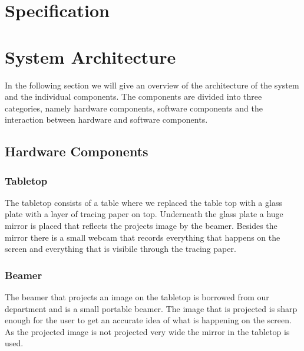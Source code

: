 \documentclass[a4paper,10pt]{article}
\begin{document}
\section{Specification}

\section{System Architecture}
\label{sec:system-architecture}
In the following section we will give an overview of the architecture of the system and the individual components.
The components are divided into three categories, namely hardware components, software components and the interaction between hardware and software components.

	\subsection{Hardware Components}
		
		\subsubsection{Tabletop}
		The tabletop consists of a table where we replaced the table top with a glass plate with a layer of tracing paper on top.
		Underneath the glass plate a huge mirror is placed that reflects the projects image by the beamer. 
		Besides the mirror there is a small webcam that records everything that happens on the screen and everything that is visibile through the tracing paper. 
		\subsubsection{Beamer}
		The beamer that projects an image on the tabletop is borrowed from our department and is a small portable beamer.
		The image that is projected is sharp enough for the user to get an accurate idea of what is happening on the screen. 
		As the projected image is not projected very wide the mirror in the tabletop is used. 
\end{document}
